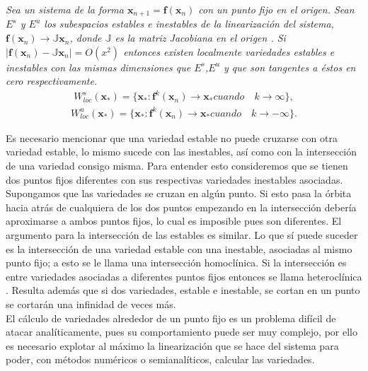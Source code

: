 \begin{thm}
\textit{Sea un sistema de la forma $\mathbf{x}_{n+1}=\mathbf{f}(\mathbf{x}_{n})$ con un punto fijo en el origen. Sean $E^{s}$ y $E^{u}$ los subespacios estables e inestables de la linearización del sistema,$\mathbf{f}(\mathbf{x}_{n})\rightarrow\mathbb{J}\mathbf{x}_{n}$,  donde $\mathbb{J}$ es la matriz Jacobiana en el origen . Si $\mid \mathbf{f}(\mathbf{x}_{n})-\mathbb{J}\mathbf{x}_{n}\mid =O(x^{2})$ entonces existen localmente variedades estables e inestables con las mismas dimensiones que $E^{s}$,$E^{u}$ y que son tangentes a éstos en cero respectivamente.}
\begin{eqnarray*}
W^{s}_{loc}(\mathbf{x}_{*})= \lbrace \mathbf{x}_{*} : \mathbf{f}^{k}(\mathbf{x}_{n})\rightarrow \mathbf{x}_{*} cuando\quad k \rightarrow \infty \rbrace,
\end{eqnarray*}
\begin{eqnarray*}
W^{u}_{loc}(\mathbf{x}_{*}) = \lbrace \mathbf{x}_{*} : \mathbf{f}^{k}(\mathbf{x}_{n})\rightarrow \mathbf{x}_{*} cuando\quad k \rightarrow -\infty \rbrace.
\end{eqnarray*}
\end{thm}

Es necesario mencionar que una variedad estable no puede cruzarse con otra variedad estable, lo mismo sucede con las inestables, así como con la intersección de una variedad consigo misma. Para entender esto consideremos que se tienen dos puntos fijos diferentes con sus respectivas variedades inestables asociadas. Supongamos que las variedades se cruzan en algún punto. Si esto pasa la órbita hacia atrás de cualquiera de los dos puntos empezando en la intersección debería aproximarse a ambos puntos fijos, lo cual es imposible pues son diferentes. El argumento para la intersección de las estables es similar. Lo que sí puede suceder es la intersección de una variedad estable con una inestable, asociadas al mismo punto fijo; a esto se le llama una intersección homoclínica. Si la intersección es entre variedades asociadas a diferentes puntos fijos entonces se llama heteroclínica \cite{Ott}. Resulta además que si dos variedades, estable e inestable, se cortan en un punto se cortarán una infinidad de veces más. \\


El cálculo de variedades alrededor de un punto fijo es un problema difícil de atacar analíticamente, pues su comportamiento puede ser muy complejo, por ello es necesario explotar al máximo la linearización que se hace del sistema para poder, con métodos numéricos o semianalíticos, calcular las variedades. 




